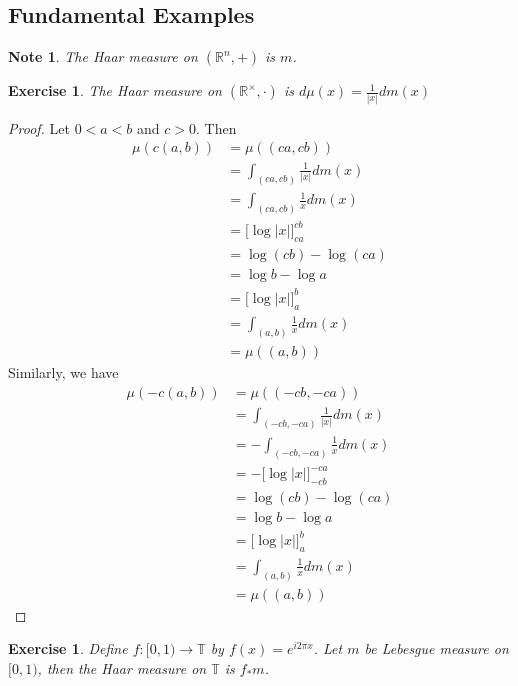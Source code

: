 \documentclass[12pt]{amsart}
\newtheorem{note}[thm]{Note}
\newtheorem{ex}[thm]{Exercise}
\newcommand{\R}{\mathbb{R}}
\newcommand{\T}{\mathbb{T}}
\begin{document}
	\subsection{Fundamental Examples}		
	
	\begin{note}
		The Haar measure on  $(\R^n, +)$ is $m$.
	\end{note}
	
	\begin{ex}
		The Haar measure on $(\R^{\times}, \cdot)$  is $d\mu(x) = \frac{1}{|x|} dm(x)$
	\end{ex}

	\begin{proof}
		Let $0 < a < b$ and $c >0$. Then
		\begin{align*}
			\mu(c(a, b))
			& = \mu((ca,cb)) \\
			& = \int_{(ca,cb)} \frac{1}{|x|} dm(x)\\
			& = \int_{(ca,cb)} \frac{1}{x} dm(x)\\
			& = \bigg[ \log|x| \bigg]_{ca}^{cb} \\
			& = \log(cb) - \log(ca) \\
			& = \log b - \log a \\
			& = \bigg[ \log|x| \bigg]_{a}^{b} \\ 
			& =  \int_{(a,b)} \frac{1}{x} dm(x)\\
			& = \mu((a,b))
		\end{align*}
	Similarly, we have
	\begin{align*}
		\mu(-c(a, b))
		& = \mu((-cb,-ca)) \\
		& = \int_{(-cb,-ca)} \frac{1}{|x|} dm(x)\\
		& = - \int_{(-cb,-ca)} \frac{1}{x} dm(x)\\
		& = - \bigg[ \log|x| \bigg]_{-cb}^{-ca} \\
		& = \log(cb) - \log(ca) \\
		& = \log b - \log a \\
		& = \bigg[ \log|x| \bigg]_{a}^{b} \\ 
		& =  \int_{(a,b)} \frac{1}{x} dm(x)\\
		& = \mu((a,b))
	\end{align*}
	\end{proof}

	\begin{ex}
		Define $f: [ 0,1) \rightarrow \T$ by $f(x) = e^{i2 \pi x}$. Let $m$ be Lebesgue measure on $[0,1)$, then the Haar measure on $\T$ is $f_*m$.
	\end{ex}
\end{document}
